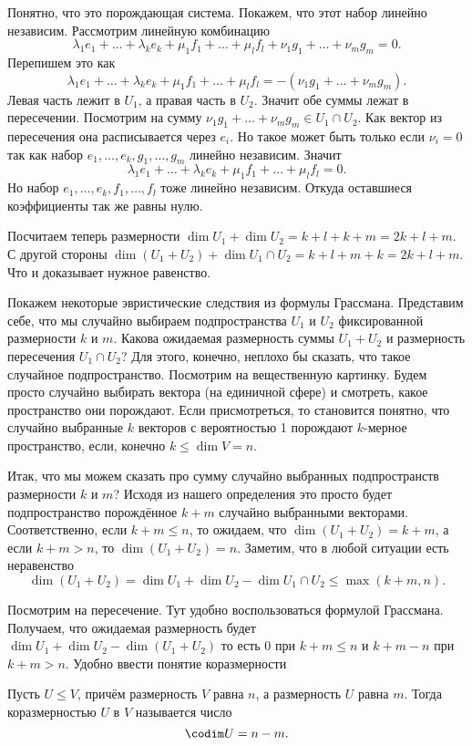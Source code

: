 Понятно, что это порождающая система. Покажем, что этот набор линейно независим. Рассмотрим линейную комбинацию
$$\lambda_1e_1+\dots+\lambda_ke_k +\mu_1 f_1+\dots+\mu_lf_l+ \nu_1g_1+\dots+\nu_m g_m=0.$$
Перепишем это как 
$$\lambda_1e_1+\dots+\lambda_ke_k +\mu_1 f_1+\dots+\mu_lf_l=-(\nu_1g_1+\dots+\nu_m g_m).$$
Левая часть лежит в $U_1$, а правая часть в $U_2$. Значит обе суммы лежат в пересечении. Посмотрим на сумму $\nu_1g_1+\dots+\nu_m g_m\in U_1\cap U_2$. Как вектор из пересечения она расписывается через $e_i$. Но такое может быть только если $\nu_i=0$ так как набор $e_1,\dots,e_k,g_1,\dots,g_m$ линейно независим.  Значит
$$\lambda_1e_1+\dots+\lambda_ke_k +\mu_1 f_1+\dots+\mu_lf_l=0.$$
Но набор $e_1,\dots,e_k,f_1,\dots,f_l$ тоже линейно независим. Откуда оставшиеся коэффициенты так же равны нулю.

Посчитаем теперь размерности $\dim U_1+\dim U_2= k+l+k+m=2k+l+m$. С другой стороны $\dim (U_1+U_2) + \dim U_1\cap U_2= k+l+m+k=2k+l+m$. Что и доказывает нужное равенство.
\endproof

Покажем некоторые эвристические следствия из формулы Грассмана. Представим себе, что мы случайно выбираем подпространства $U_1$ и $U_2$ фиксированной размерности $k$ и $m$. Какова ожидаемая размерность суммы $U_1+U_2$ и размерность пересечения $U_1\cap U_2$?  Для этого, конечно, неплохо бы сказать, что такое случайное подпространство. Посмотрим на вещественную картинку.  Будем просто случайно выбирать вектора (на единичной сфере) и смотреть, какое пространство они порождают. Если присмотреться, то становится понятно, что случайно выбранные $k$ векторов с вероятностью 1 порождают $k$-мерное пространство, если, конечно $k\leq \dim V=n$. 

Итак, что мы можем сказать про сумму случайно выбранных подпространств размерности $k$ и $m$? Исходя из нашего определения это просто будет подпространство порождённое $k+m$ случайно выбранными векторами. Соответственно, если $k+m\leq n$, то ожидаем, что $\dim (U_1+U_2)=k+m$, а если $k+m > n$, то $\dim (U_1+U_2)=n$. Заметим, что в любой ситуации есть неравенство
$$\dim (U_1+U_2)=\dim U_1+\dim U_2 - \dim U_1\cap U_2 \leq \max(k+m,n).$$

Посмотрим на пересечение. Тут удобно воспользоваться формулой Грассмана. Получаем, что ожидаемая размерность будет $\dim U_1 + \dim U_2 - \dim (U_1+U_2)$ то есть $0$ при $k+m \leq n$ и $k+m-n$ при $k+m>n$. Удобно ввести понятие коразмерности 

\dfn Пусть $U\leq V$, причём размерность $V$ равна $n$, а размерность $U$ равна $m$. Тогда коразмерностью $U$  в $V$ называется число  
$$\codim U =n-m.$$
\edfn


